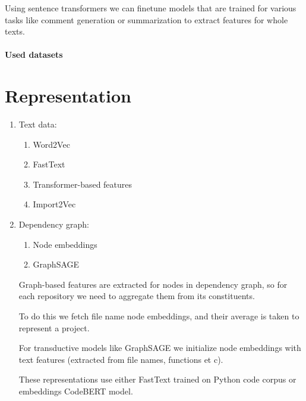 \documentclass[11pt]{report}
\begin{document}
Using sentence transformers we can finetune models that are trained for various tasks like comment generation or summarization to extract features for whole texts.

\paragraph{Used datasets}

\section{Representation}

\begin{enumerate}

\item Text data:

\begin{enumerate}

\item Word2Vec

\item FastText

\item Transformer-based features

\item Import2Vec

\end{enumerate}



\item Dependency graph:

\begin{enumerate}

\item Node embeddings

\item GraphSAGE

\end{enumerate}



Graph-based features are extracted for nodes in dependency graph, so for each repository we need to aggregate them from its constituents.

To do this we fetch file name node embeddings, and their average is taken to represent a project.

For transductive models like GraphSAGE we initialize node embeddings with text features (extracted from file names, functions et c).

These representations use either FastText trained on Python code corpus or embeddings CodeBERT model.

\end{enumerate}
\end{document}
